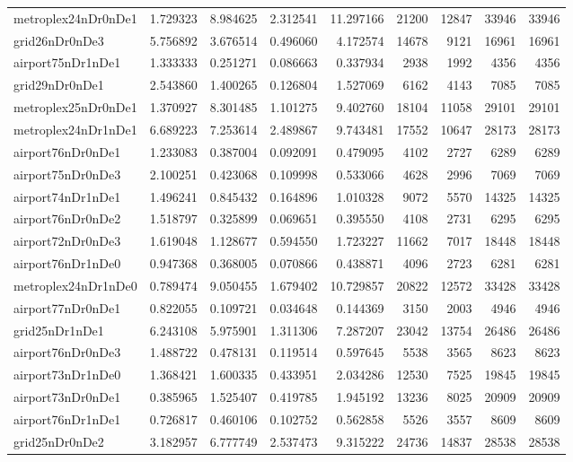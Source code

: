 \begin{longtable}{|l|r|r|r|r|r|r|r|r|}
metroplex24nDr0nDe1 & 1.729323 & 8.984625 & 2.312541 & 11.297166 & 21200 & 12847 & 33946 & 33946 \\
grid26nDr0nDe3 & 5.756892 & 3.676514 & 0.496060 & 4.172574 & 14678 & 9121 & 16961 & 16961 \\
airport75nDr1nDe1 & 1.333333 & 0.251271 & 0.086663 & 0.337934 & 2938 & 1992 & 4356 & 4356 \\
grid29nDr0nDe1 & 2.543860 & 1.400265 & 0.126804 & 1.527069 & 6162 & 4143 & 7085 & 7085 \\
metroplex25nDr0nDe1 & 1.370927 & 8.301485 & 1.101275 & 9.402760 & 18104 & 11058 & 29101 & 29101 \\
metroplex24nDr1nDe1 & 6.689223 & 7.253614 & 2.489867 & 9.743481 & 17552 & 10647 & 28173 & 28173 \\
airport76nDr0nDe1 & 1.233083 & 0.387004 & 0.092091 & 0.479095 & 4102 & 2727 & 6289 & 6289 \\
airport75nDr0nDe3 & 2.100251 & 0.423068 & 0.109998 & 0.533066 & 4628 & 2996 & 7069 & 7069 \\
airport74nDr1nDe1 & 1.496241 & 0.845432 & 0.164896 & 1.010328 & 9072 & 5570 & 14325 & 14325 \\
airport76nDr0nDe2 & 1.518797 & 0.325899 & 0.069651 & 0.395550 & 4108 & 2731 & 6295 & 6295 \\
airport72nDr0nDe3 & 1.619048 & 1.128677 & 0.594550 & 1.723227 & 11662 & 7017 & 18448 & 18448 \\
airport76nDr1nDe0 & 0.947368 & 0.368005 & 0.070866 & 0.438871 & 4096 & 2723 & 6281 & 6281 \\
metroplex24nDr1nDe0 & 0.789474 & 9.050455 & 1.679402 & 10.729857 & 20822 & 12572 & 33428 & 33428 \\
airport77nDr0nDe1 & 0.822055 & 0.109721 & 0.034648 & 0.144369 & 3150 & 2003 & 4946 & 4946 \\
grid25nDr1nDe1 & 6.243108 & 5.975901 & 1.311306 & 7.287207 & 23042 & 13754 & 26486 & 26486 \\
airport76nDr0nDe3 & 1.488722 & 0.478131 & 0.119514 & 0.597645 & 5538 & 3565 & 8623 & 8623 \\
airport73nDr1nDe0 & 1.368421 & 1.600335 & 0.433951 & 2.034286 & 12530 & 7525 & 19845 & 19845 \\
airport73nDr0nDe1 & 0.385965 & 1.525407 & 0.419785 & 1.945192 & 13236 & 8025 & 20909 & 20909 \\
airport76nDr1nDe1 & 0.726817 & 0.460106 & 0.102752 & 0.562858 & 5526 & 3557 & 8609 & 8609 \\
grid25nDr0nDe2 & 3.182957 & 6.777749 & 2.537473 & 9.315222 & 24736 & 14837 & 28538 & 28538 \\

\end{longtable}

